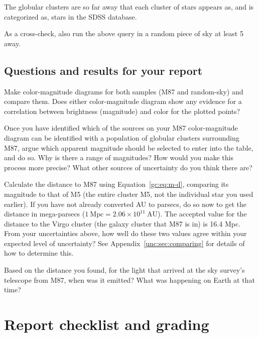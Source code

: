 The globular clusters are so far away that each cluster of stars appears as, and is categorized as, stars in
the SDSS database.

\begin{steps}
	\item As a cross-check, also run the above query in a random piece of sky at least
5\textdegree{} away.
\end{steps}

\subsection{Questions and results for your report}

\begin{steps}
	\item Make color-magnitude diagrams for both samples (M87 and random-sky)
	and compare them. Does either color-magnitude diagram show any
	evidence for a correlation between brightness (magnitude) and color for the
	plotted points?
	
	\item Once you have identified which of the sources on your M87 color-magnitude
	diagram can be identified with a population of globular clusters surrounding
	M87, argue which apparent magnitude should be selected to enter into the table, and do so. Why is there a range of magnitudes? How would you make this
	process more precise? What other sources of uncertainty do you think
	there are?
	
	\item Calculate the distance to M87 using Equation~\ref{gc:eq:m-d}, comparing its magnitude to that of M5 (the entire cluster M5, not the individual star you used earlier). If you have not already converted AU to
	parsecs, do so now to get the distance in mega-parsecs ($1\:\mathrm{Mpc} = 2.06 \times
	10^{11}\:\mathrm{AU}$). The accepted value for the distance to the Virgo cluster (the galaxy cluster that M87 is in) is 16.4
	Mpc. From your uncertainties above, how well do these two values agree within your expected level
	of uncertainty? See Appendix~\ref{unc:sec:comparing} for details of how to determine this.
	
	\item Based on the distance you found, for the light that arrived at the sky survey's telescope from M87, when was it emitted? What was happening on Earth at that time?
\end{steps}

\section{Report checklist and grading}

